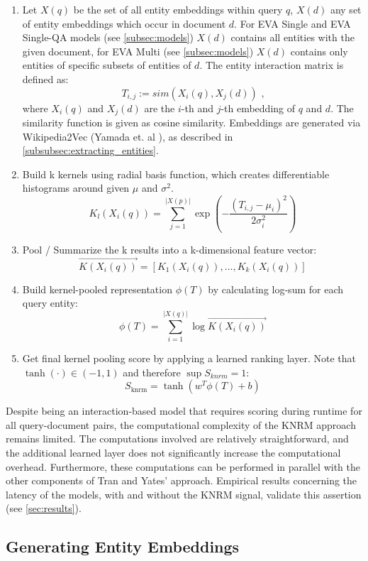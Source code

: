 \begin{enumerate}
    \item Let $X(q)$ be the set of all entity embeddings within query $q$, $X(d)$ any set of entity embeddings which occur in document $d$. For EVA Single and EVA Single-QA models (see \autoref{subsec:models}) $X(d)$ contains all entities with the given document, for EVA Multi (see \autoref{subsec:models}) $X(d)$ contains only entities of specific subsets of entities of $d$. The entity interaction matrix is defined as: 
    \[T_{i,j} := sim(X_i(q), X_j(d)) \text{~,}\]
    where $X_i(q)$ and $X_j(d)$ are the $i$-th and $j$-th embedding of $q$ and $d$. The similarity function is given as cosine similarity. Embeddings are generated via Wikipedia2Vec (Yamada et. al \cite{yamada2018wikipedia2vec}), as described in \autoref{subsubsec:extracting_entities}.
    \item Build k kernels using radial basis function, which creates differentiable histograms around given $\mu$ and $\sigma^2$.
    \[ K_l(X_i(q)) = \sum_{j=1}^{|X(p)|}\exp\left(-\frac{(T_{i,j}-\mu_i)^2}{2\sigma_i^2}\right)\]
    \item Pool / Summarize the k results into a k-dimensional feature vector: \[\overrightarrow{K(X_i(q))} = [K_1(X_i(q)), \ldots, K_k(X_i(q))]\]
    \item Build kernel-pooled representation $\phi(T)$ by calculating log-sum for each query entity: \[\phi(T) = \sum_{i=1}^{|X(q)|} \log \overrightarrow{K(X_i(q))}\]
    \item Get final kernel pooling score by applying a learned ranking layer. Note that $\tanh(\cdot) \in (-1, 1)$ and therefore $\sup S_{knrm} = 1$: \[ S_{\text{knrm}} = \tanh(w^T\phi(T) + b) \]
  \end{enumerate}

Despite being an interaction-based model that requires scoring during runtime for all query-document pairs, the computational complexity of the KNRM approach remains limited. The computations involved are relatively straightforward, and the additional learned layer does not significantly increase the computational overhead. Furthermore, these computations can be performed in parallel with the other components of Tran and Yates' approach. Empirical results concerning the latency of the models, with and without the KNRM signal, validate this assertion (see \autoref{sec:results}).

\subsection{Generating Entity Embeddings\label{subsec:entity_embeddings}}


